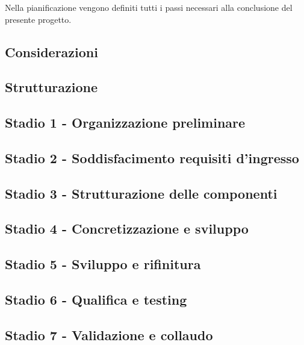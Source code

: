 Nella pianificazione vengono definiti tutti i passi necessari alla conclusione del presente progetto.

\subsection{Considerazioni}\label{sec:Considerazioni}


\subsection{Strutturazione}\label{sec:Strutturazione}


\subsection{Stadio 1 - Organizzazione preliminare}\label{sec:Stadio1}


\subsection{Stadio 2 - Soddisfacimento requisiti d'ingresso}\label{sec:Stadio2}

    
\subsection{Stadio 3 - Strutturazione delle componenti}\label{sec:Stadio3}

    
\subsection{Stadio 4 - Concretizzazione e sviluppo}\label{sec:Stadio4}

    
\subsection{Stadio 5 - Sviluppo e rifinitura }\label{sec:Stadio5}

    
\subsection{Stadio 6 - Qualifica e testing}\label{sec:Stadio6}

    
\subsection{Stadio 7 - Validazione e collaudo}\label{sec:Stadio7}
